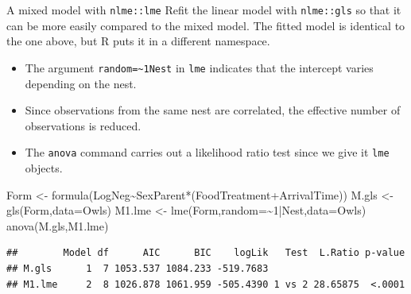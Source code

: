 \documentclass[
  ignorenonframetext,
]{beamer}
\newenvironment{Shaded}{\begin{snugshade}}{\end{snugshade}}
\newcommand{\AttributeTok}[1]{\textcolor[rgb]{0.77,0.63,0.00}{#1}}
\newcommand{\DecValTok}[1]{\textcolor[rgb]{0.00,0.00,0.81}{#1}}
\newcommand{\FunctionTok}[1]{\textcolor[rgb]{0.00,0.00,0.00}{#1}}
\newcommand{\NormalTok}[1]{#1}
\newcommand{\OtherTok}[1]{\textcolor[rgb]{0.56,0.35,0.01}{#1}}
\newcommand{\SpecialCharTok}[1]{\textcolor[rgb]{0.00,0.00,0.00}{#1}}
\providecommand{\tightlist}{%
  \setlength{\itemsep}{0pt}\setlength{\parskip}{0pt}}
\begin{document}
\begin{frame}[fragile]{A mixed model with \texttt{nlme::lme}}
\protect\hypertarget{a-mixed-model-with-nlmelme}{}
Refit the linear model with \texttt{nlme::gls} so that it can be more
easily compared to the mixed model. The fitted model is identical to the
one above, but R puts it in a different namespace.

\begin{itemize}
\tightlist
\item
  The argument \texttt{random=\textasciitilde{}1\textbar{}Nest} in
  \texttt{lme} indicates that the intercept varies depending on the
  nest.
\item
  Since observations from the same nest are correlated, the effective
  number of observations is reduced.
\item
  The \texttt{anova} command carries out a likelihood ratio test since
  we give it \texttt{lme} objects.
\end{itemize}

\scriptsize

\begin{Shaded}
\begin{Highlighting}[]
\NormalTok{Form }\OtherTok{\textless{}{-}} \FunctionTok{formula}\NormalTok{(LogNeg}\SpecialCharTok{\textasciitilde{}}\NormalTok{SexParent}\SpecialCharTok{*}\NormalTok{(FoodTreatment}\SpecialCharTok{+}\NormalTok{ArrivalTime))}
\NormalTok{M.gls }\OtherTok{\textless{}{-}} \FunctionTok{gls}\NormalTok{(Form,}\AttributeTok{data=}\NormalTok{Owls)}
\NormalTok{M1.lme }\OtherTok{\textless{}{-}} \FunctionTok{lme}\NormalTok{(Form,}\AttributeTok{random=}\SpecialCharTok{\textasciitilde{}}\DecValTok{1}\SpecialCharTok{|}\NormalTok{Nest,}\AttributeTok{data=}\NormalTok{Owls)}
\FunctionTok{anova}\NormalTok{(M.gls,M1.lme)}
\end{Highlighting}
\end{Shaded}

\begin{verbatim}
##        Model df      AIC      BIC    logLik   Test  L.Ratio p-value
## M.gls      1  7 1053.537 1084.233 -519.7683                        
## M1.lme     2  8 1026.878 1061.959 -505.4390 1 vs 2 28.65875  <.0001
\end{verbatim}
\end{frame}
\end{document}
